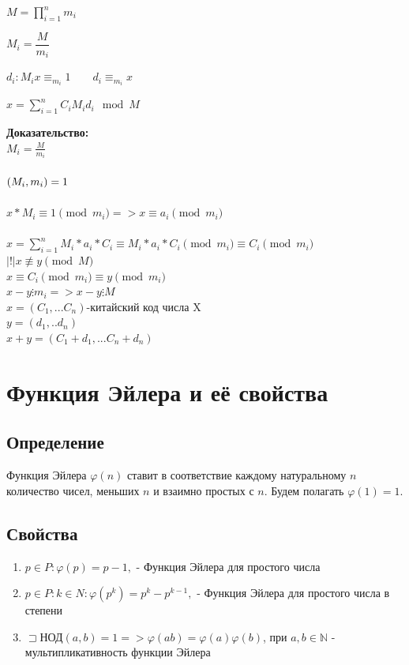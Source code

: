 \documentclass[12pt]{article}
\let\gcd\relax
\DeclareMathOperator{\gcd}{НОД}
\begin{document}
$\displaystyle M = \prod_{i = 1}^{n}m_i$

$\displaystyle M_i = \dfrac{M}{m_i}$

$\displaystyle d_i : M_ix\equiv_{m_i} 1 \qquad d_i\equiv_{m_i}x$

$\displaystyle x = \sum_{i = 1}^{n}C_iM_id_i \mod M$

\textbf{Доказательство:}\\
$M_i=\frac{M}{m_i}$\\
\\
$\gcd(M_i, m_i) = 1 $\\
\\
$x*M_i\equiv 1\pmod{m_i} => x\equiv a_i\pmod{m_i} $\\
\\
$x = \sum_{i=1}^{n} M_i*a_i*C_i\equiv M_i*a_i*C_i\pmod{m_i}\equiv C_i\pmod{m_i} $\\
$|!| x \not\equiv y \pmod{M} $\\
$x\equiv C_i\pmod{m_i}\equiv y\pmod{m_i}$\\
$x-y\vdots m_i => x-y\vdots M$\\
$x = (C_1,...C_n)$-китайский код числа X\\
$y = (d_1,..d_n)$\\
$x+y = (C_1+d_1,...C_n+d_n)$

\setcounter{section}{7}

\section{Функция Эйлера и её свойства}

\subsection{Определение} Функция Эйлера $\varphi(n)$ ставит в соответствие каждому натуральному $n$ количество чисел, меньших $n$ и взаимно простых с $n$. Будем полагать $\varphi(1)=1$.

\subsection{Свойства}
\begin{enumerate}
    \item $p\in P:\varphi(p)=p-1,$ - Функция Эйлера для простого числа
    \item $p\in P:k\in N:\varphi(p^{k})=p^{k}-p^{k-1},$ - Функция Эйлера для простого числа в степени
    \item $\sqsupset$НОД$(a,b)=1=>\varphi(ab)=\varphi(a)\varphi(b)$, при $a,b\in \mathbb{N}$ - мультипликативность функции Эйлера
\end{enumerate}
\end{document}
